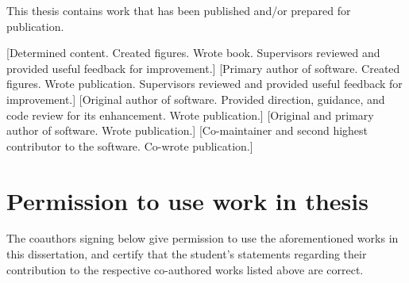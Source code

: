 \documentclass{book}
\begin{document}
This thesis contains work that has been published and/or prepared for publication.






[Determined content. Created figures. Wrote book. Supervisors reviewed and provided useful feedback for improvement.]
[Primary author of software. Created figures. Wrote publication. Supervisors reviewed and provided useful feedback for improvement.]
[Original author of software. Provided direction, guidance, and code review for its enhancement. Wrote publication.]
[Original and primary author of software. Wrote publication.]
[Co-maintainer and second highest contributor to the software. Co-wrote publication.]

\newpage

\section*{Permission to use work in thesis}
The coauthors signing below give permission to use the aforementioned works
in this dissertation,
and certify that the student's statements regarding their contribution to the respective co-authored works listed above are correct.


\vspace{1cm}
\end{document}
